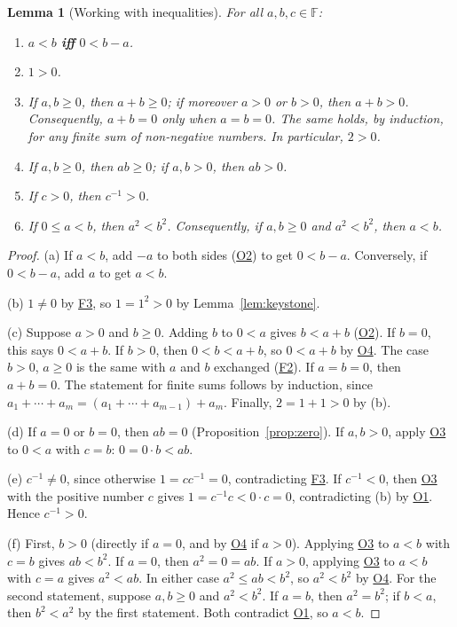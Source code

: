 \documentclass[11pt]{article}
\newcommand{\axF}[1]{\hyperref[ax:F#1]{F#1}}
\newcommand{\axO}[1]{\hyperref[ax:O#1]{O#1}}
\theoremstyle{plain}
\newtheorem{lemma}[theorem]{Lemma}
\theoremstyle{definition}
\theoremstyle{remark}
\begin{document}
\begin{lemma}[Working with inequalities]\label{lem:order}
For all $a, b, c \in \mathbb{F}$:
\begin{enumerate}
    \item[(a)] $a < b$ \textbf{iff} $0 < b - a$.
    \item[(b)] $1 > 0$.
    \item[(c)] If $a, b \geq 0$, then $a + b \geq 0$; if moreover $a > 0$ or $b > 0$, then $a + b > 0$. Consequently, $a + b = 0$ only when $a = b = 0$. The same holds, by induction, for any finite sum of non-negative numbers. In particular, $2 > 0$.
    \item[(d)] If $a, b \geq 0$, then $a b \geq 0$; if $a, b > 0$, then $a b > 0$.
    \item[(e)] If $c > 0$, then $c^{-1} > 0$.
    \item[(f)] If $0 \leq a < b$, then $a^2 < b^2$. Consequently, if $a, b \geq 0$ and $a^2 < b^2$, then $a < b$.
\end{enumerate}
\end{lemma}
\begin{proof}
(a) If $a < b$, add $-a$ to both sides (\axO{2}) to get $0 < b - a$. Conversely, if $0 < b - a$, add $a$ to get $a < b$.

(b) $1 \neq 0$ by \axF{3}, so $1 = 1^2 > 0$ by Lemma~\ref{lem:keystone}.

(c) Suppose $a > 0$ and $b \geq 0$. Adding $b$ to $0 < a$ gives $b < a + b$ (\axO{2}). If $b = 0$, this says $0 < a + b$. If $b > 0$, then $0 < b < a + b$, so $0 < a + b$ by \axO{4}. The case $b > 0$, $a \geq 0$ is the same with $a$ and $b$ exchanged (\axF{2}). If $a = b = 0$, then $a + b = 0$. The statement for finite sums follows by induction, since $a_1 + \cdots + a_m = (a_1 + \cdots + a_{m-1}) + a_m$. Finally, $2 = 1 + 1 > 0$ by (b).

(d) If $a = 0$ or $b = 0$, then $a b = 0$ (Proposition~\ref{prop:zero}). If $a, b > 0$, apply \axO{3} to $0 < a$ with $c = b$: $0 = 0 \cdot b < a b$.

(e) $c^{-1} \neq 0$, since otherwise $1 = c c^{-1} = 0$, contradicting \axF{3}. If $c^{-1} < 0$, then \axO{3} with the positive number $c$ gives $1 = c^{-1} c < 0 \cdot c = 0$, contradicting (b) by \axO{1}. Hence $c^{-1} > 0$.

(f) First, $b > 0$ (directly if $a = 0$, and by \axO{4} if $a > 0$). Applying \axO{3} to $a < b$ with $c = b$ gives $a b < b^2$. If $a = 0$, then $a^2 = 0 = a b$. If $a > 0$, applying \axO{3} to $a < b$ with $c = a$ gives $a^2 < a b$. In either case $a^2 \leq a b < b^2$, so $a^2 < b^2$ by \axO{4}. For the second statement, suppose $a, b \geq 0$ and $a^2 < b^2$. If $a = b$, then $a^2 = b^2$; if $b < a$, then $b^2 < a^2$ by the first statement. Both contradict \axO{1}, so $a < b$.
\end{proof}
\end{document}
